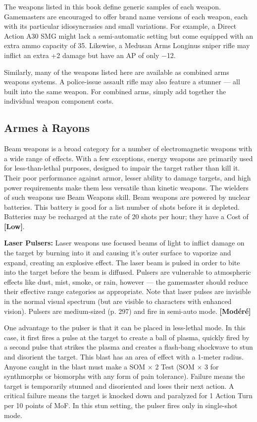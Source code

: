 {{The weapons listed in this book define generic samples of each weapon. Gamemasters are encouraged to offer brand name versions of each weapon, each with its particular idiosyncrasies and small variations. For example, a Direct Action A30 SMG might lack a semi-automatic setting but come equipped with an extra ammo capacity of 35. Likewise, a Medusan Arms Longinus sniper rifle may inflict an extra +2 damage but have an AP of only $-$12. 

Similarly, many of the weapons listed here are available as combined arms weapons systems. A police-issue assault rifle may also feature a stunner --- all built into the same weapon. For combined arms, simply add together the individual weapon component costs. 



\subsection{Armes à Rayons} \label{sec:beam-weapons} 

Beam weapons is a broad category for a number of electromagnetic weapons with a wide range of effects. With a few exceptions, energy weapons are primarily used for less-than-lethal purposes, designed to impair the target rather than kill it. Their poor performance against armor, lesser ability to damage targets, and high power requirements make them less versatile than kinetic weapons. The wielders of such weapons use Beam Weapons skill. Beam weapons are powered by nuclear batteries. This battery is good for a list number of shots before it is depleted. Batteries may be recharged at the rate of 20 shots per hour; they have a Cost of \textbf{[Low]}. 

\textbf{Laser Pulsers:} Laser weapons use focused beams of light to inflict damage on the target by burning into it and causing it’s outer surface to vaporize and expand, creating an explosive effect. The laser beam is pulsed in order to bite into the target before the beam is diffused. Pulsers are vulnerable to atmospheric effects like dust, mist, smoke, or rain, however --- the gamemaster should reduce their effective range categories as appropriate. Note that laser pulses are invisible in the normal visual spectrum (but are visible to characters with enhanced vision). Pulsers are medium-sized (p. 297) and fire in semi-auto mode. \textbf{[Modéré]} 

One advantage to the pulser is that it can be placed in less-lethal mode. In this case, it first fires a pulse at the target to create a ball of plasma, quickly fired by a second pulse that strikes the plasma and creates a flash-bang shockwave to stun and disorient the target. This blast has an area of effect with a 1-meter radius. Anyone caught in the blast must make a SOM $\times$ 2 Test (SOM $\times$ 3 for synthmorphs or biomorphs with any form of pain tolerance). Failure means the target is temporarily stunned and disoriented and loses their next action. A critical failure means the target is knocked down and paralyzed for 1 Action Turn per 10 points of MoF. In this stun setting, the pulser fires only in single-shot mode. 

}}
